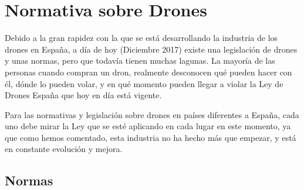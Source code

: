\section{Normativa sobre Drones}
\label{sec:normativa}

Debido a la gran rapidez con la que se está desarrollando la industria de los drones en España, a día de hoy (Diciembre 2017) existe una legislación\cite{normativa} de drones y unas normas, pero que todavía tienen muchas lagunas. La mayoría de las personas cuando compran un dron, realmente desconocen qué pueden hacer con él, dónde lo pueden volar, y en qué momento pueden llegar a violar la Ley de Drones España que hoy en día está vigente.

Para las normativas y legislación sobre drones en países diferentes a España, cada uno debe mirar la Ley que se esté aplicando en cada lugar en este momento, ya que como hemos comentado, esta industria no ha hecho más que empezar, y está en constante evolución y mejora.

\subsection{Normas}

